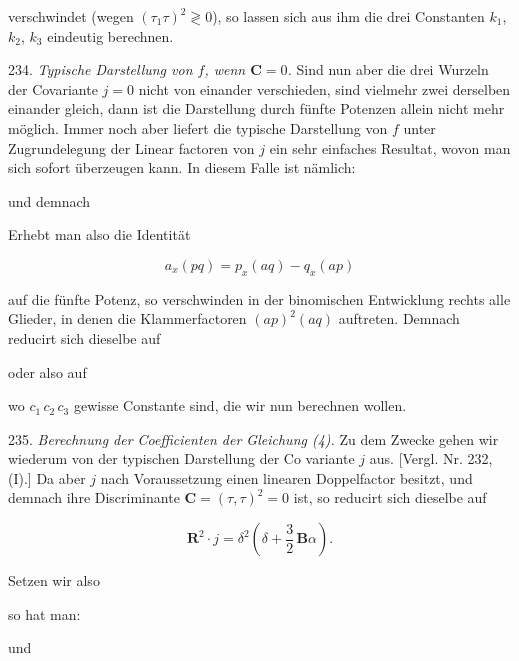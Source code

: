 verschwindet (wegen $(\tau_1\tau)^2 \gtrless 0$), so lassen sich aus ihm die drei
Constanten $k_1$, $k_2$, $k_3$ eindeutig berechnen.

234. \textit{Typische Darstellung von $f$, wenn $\mathbf{C} = 0$.} Sind nun aber die
drei Wurzeln der Covariante $j = 0$ nicht von einander verschieden,
sind vielmehr zwei derselben einander gleich, dann ist die Darstellung
durch fünfte Potenzen allein nicht mehr möglich. Immer noch aber
liefert die typische Darstellung von $f$ unter Zugrundelegung der Linear\-
factoren von $j$ ein sehr einfaches Resultat, wovon man sich sofort
überzeugen kann. In diesem Falle ist nämlich:


und demnach


Erhebt man also die Identität

\[
a_x(pq) = p_x(aq) - q_x(ap)
\]

auf die fünfte Potenz, so verschwinden in der binomischen Entwicklung
rechts alle Glieder, in denen die Klammerfactoren $(ap)^2(aq)$ auftreten.
Demnach reducirt sich dieselbe auf


oder also auf


wo $c_1\,c_2\,c_3$ gewisse Constante sind, die wir nun berechnen wollen.

235. \textit{Berechnung der Coefficienten der Gleichung (4).} Zu dem
Zwecke gehen wir wiederum von der typischen Darstellung der Co\-
variante $j$ aus. [Vergl. Nr. 232, (I).] Da aber $j$ nach Voraussetzung
einen linearen Doppelfactor besitzt, und demnach ihre Discriminante
$\mathbf{C} = (\tau,\tau)^2 = 0$ ist, so reducirt sich dieselbe auf

\[
\mathbf{R}^2\cdot j = \delta^2\left(\delta + \frac32\,\mathbf{B}\alpha\right).
\]

Setzen wir also


so hat man:


und


